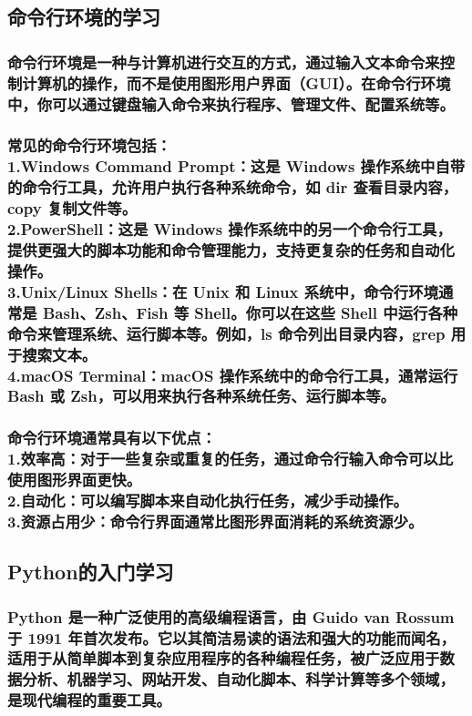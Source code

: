 \documentclass[UTF8,a4paper]{ctexart}
\begin{document}
\begin{sloppypar}
	\subsection{命令行环境的学习}
	\subsubsection{命令行环境是一种与计算机进行交互的方式，通过输入文本命令来控制计算机的操作，而不是使用图形用户界面（GUI）。在命令行环境中，你可以通过键盘输入命令来执行程序、管理文件、配置系统等。}
	\subsubsection{常见的命令行环境包括：\\1.Windows Command Prompt：这是 Windows 操作系统中自带的命令行工具，允许用户执行各种系统命令，如 dir 查看目录内容，copy 复制文件等。\\2.PowerShell：这是 Windows 操作系统中的另一个命令行工具，提供更强大的脚本功能和命令管理能力，支持更复杂的任务和自动化操作。\\3.Unix/Linux Shells：在 Unix 和 Linux 系统中，命令行环境通常是 Bash、Zsh、Fish 等 Shell。你可以在这些 Shell 中运行各种命令来管理系统、运行脚本等。例如，ls 命令列出目录内容，grep 用于搜索文本。\\4.macOS Terminal：macOS 操作系统中的命令行工具，通常运行 Bash 或 Zsh，可以用来执行各种系统任务、运行脚本等。}
	\subsubsection{命令行环境通常具有以下优点：\\1.效率高：对于一些复杂或重复的任务，通过命令行输入命令可以比使用图形界面更快。\\2.自动化：可以编写脚本来自动化执行任务，减少手动操作。\\3.资源占用少：命令行界面通常比图形界面消耗的系统资源少。}
	\subsection{Python的入门学习}
	\subsubsection{Python 是一种广泛使用的高级编程语言，由 Guido van Rossum 于 1991 年首次发布。它以其简洁易读的语法和强大的功能而闻名，适用于从简单脚本到复杂应用程序的各种编程任务，被广泛应用于数据分析、机器学习、网站开发、自动化脚本、科学计算等多个领域，是现代编程的重要工具。}

\end{sloppypar}
\end{document}
